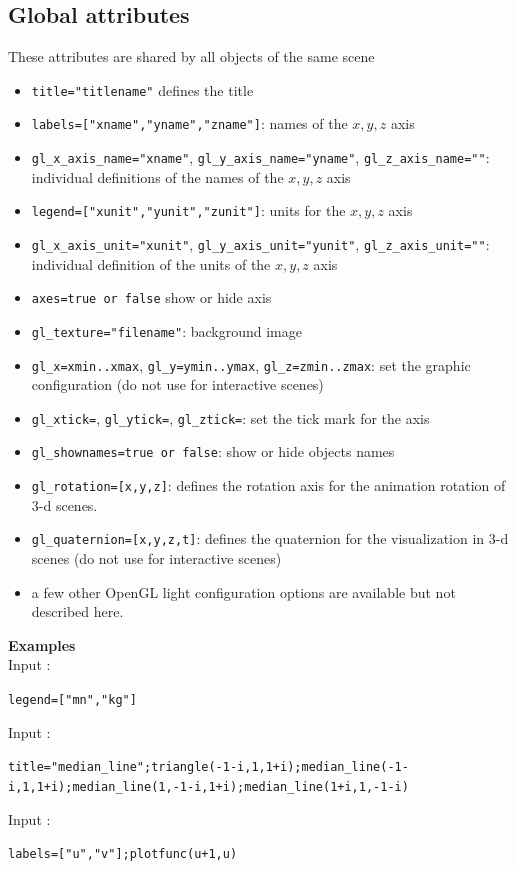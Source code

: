 \documentclass[a4paper,11pt]{book}
\begin{document}
\subsection{Global attributes}
These attributes are shared by all objects of the same scene
\begin{itemize}
\item {\tt title="titlename"} defines the title
\item {\tt labels=["xname","yname","zname"]}: names of the $x,y,z$
axis
\item {\tt gl\_x\_axis\_name="xname"}, {\tt gl\_y\_axis\_name="yname"},
{\tt gl\_z\_axis\_name=""}: individual definitions
of the names of the $x,y,z$ axis
\item {\tt legend=["xunit","yunit","zunit"]}: units for the
$x,y,z$ axis
\item {\tt gl\_x\_axis\_unit="xunit"}, {\tt  gl\_y\_axis\_unit="yunit"},
{\tt gl\_z\_axis\_unit=""}: individual definition
of the units of the $x,y,z$ axis
\item {\tt axes=true or false} show or hide axis
\item {\tt gl\_texture="filename"}: background image
\item {\tt gl\_x=xmin..xmax}, {\tt gl\_y=ymin..ymax},
{\tt gl\_z=zmin..zmax}: set the graphic configuration 
(do not use for interactive scenes)
\item {\tt gl\_xtick=}, {\tt gl\_ytick=}, {\tt gl\_ztick=}:
set the tick mark for the axis 
\item {\tt gl\_shownames=true or false}: show or hide objects names
\item {\tt gl\_rotation=[x,y,z]}: defines the rotation axis
for the animation rotation of 3-d scenes.
\item {\tt gl\_quaternion=[x,y,z,t]}: defines the quaternion
for the visualization in 3-d scenes (do not use for interactive
scenes)
\item a few other OpenGL light configuration options are
available but not described here.
\end{itemize}
{\bf Examples}\\
Input :
\begin{center}{\tt legend=["mn","kg"]}\end{center}
Input :
\begin{center}{\tt title="median\_line";triangle(-1-i,1,1+i);median\_line(-1-i,1,1+i);median\_line(1,-1-i,1+i);median\_line(1+i,1,-1-i)}\end{center}
Input :
\begin{center}{\tt labels=["u","v"];plotfunc(u+1,u)}\end{center}
\end{document}
